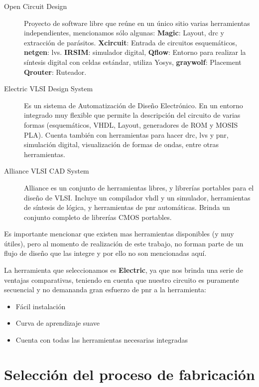 \begin{description}
\item[Open Circuit Design] Proyecto de software libre que reúne en un único sitio varias herramientas independientes, mencionamos sólo algunas:  \textbf{Magic}: Layout, \gls{drc} y extracción de parásitos. \textbf{Xcircuit}: Entrada de circuitos esquemáticos, \textbf{netgen}: \gls{lvs}. \textbf{IRSIM}: simulador digital, \textbf{Qflow}: Entorno para realizar la síntesis digital con celdas estándar, utiliza Yosys\cite{Yosys}, \textbf{graywolf}: Placement \textbf{Qrouter}: Ruteador.

\item[Electric VLSI Design System\cite{Electric}] Es un sistema de Automatización de Diseño Electrónico. En un entorno integrado muy flexible que permite la descripción del circuito de varias formas (esquemáticos, VHDL, Layout, generadores de ROM y MOSIS PLA). Cuenta también con herramientas para hacer \gls{drc}, \gls{lvs} y \gls{pnr}, simulación digital, visualización de formas de ondas, entre otras herramientas.

\item[Alliance VLSI CAD System\cite{Alliance}] Alliance es un conjunto de herramientas libres, y librerías portables para el diseño de VLSI. Incluye un compilador vhdl y un simulador, herramientas de síntesis de lógica, y herramientas de \gls{pnr} automáticas. Brinda un conjunto completo de librerías CMOS portables.

\end{description}

Es importante mencionar que existen mas herramientas disponibles (y muy útiles), pero al momento de realización de este trabajo, no forman parte de un flujo de diseño que las integre y por ello no son mencionadas aquí. 

La herramienta que seleccionamos es \textbf{Electric}, ya que nos brinda una serie de ventajas comparativas, teniendo en cuenta que nuestro circuito es puramente secuencial y no demananda gran esfuerzo de \gls{pnr} a la herramienta:
\begin{itemize}
\item Fácil instalación
\item Curva de aprendizaje suave
\item Cuenta con todas las herramientas necesarias integradas
\end{itemize}

\section{Selección del proceso de fabricación}\label{procesoFabricación}

